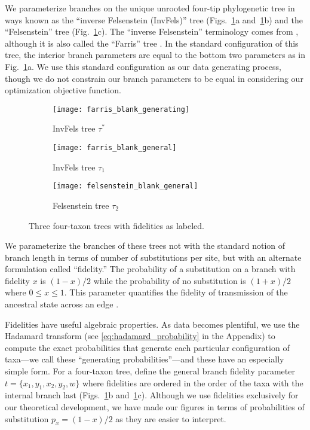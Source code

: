 \documentclass[11pt]{article}
\begin{document}
We parameterize branches on the unique unrooted four-tip phylogenetic tree in ways known as the ``inverse Felsenstein (InvFels)'' tree (Figs.~\ref{fig:farris-fels-top}a and~\ref{fig:farris-fels-top}b) and the ``Felsenstein'' tree (Fig.~\ref{fig:farris-fels-top}c).
The ``inverse Felsenstein'' terminology comes from \citet{Swofford2001-hr}, although it is also called the ``Farris'' tree \citep{Siddall1998-hq, Felsenstein2004}.
In the standard configuration of this tree, the interior branch parameters are equal to the bottom two parameters as in Fig.~\ref{fig:farris-fels-top}a.
We use this standard configuration as our data generating process, though we do not constrain our branch parameters to be equal in considering our optimization objective function.

\begin{figure}
\centering
\begin{subfigure}{.3\linewidth}
\centering
\texttt{[image: farris\_blank\_generating]}
\caption[short]{InvFels tree $\tau^*$}
\end{subfigure}
\begin{subfigure}{.3\linewidth}
\centering
\texttt{[image: farris\_blank\_general]}
\caption[short]{InvFels tree $\tau_1$}
\end{subfigure}
\begin{subfigure}{.3\linewidth}
\centering
\texttt{[image: felsenstein\_blank\_general]}
\caption[short]{Felsenstein tree $\tau_2$}
\end{subfigure}
\caption{Three four-taxon trees with fidelities as labeled.}
\label{fig:farris-fels-top}
\end{figure}

We parameterize the branches of these trees not with the standard notion of branch length in terms of number of substitutions per site, but with an alternate formulation called ``fidelity.''
The probability of a substitution on a branch with fidelity $x$ is $(1-x)/2$ while the probability of no substitution is $(1+x)/2$ where $0 \le x \le 1$.
This parameter quantifies the fidelity of transmission of the ancestral state across an edge \citep{Matsen2007-jq}.

Fidelities have useful algebraic properties.
As data becomes plentiful, we use the Hadamard transform (see \eqref{eq:hadamard_probability} in the Appendix) to compute the exact probabilities that generate each particular configuration of taxa---we call these ``generating probabilities''---and these have an especially simple form.
For a four-taxon tree, define the general branch fidelity parameter $t=\{x_1,y_1,x_2,y_2,w\}$ where fidelities are ordered in the order of the taxa with the internal branch last (Figs.~\ref{fig:farris-fels-top}b and~\ref{fig:farris-fels-top}c).
Although we use fidelities exclusively for our theoretical development, we have made our figures in terms of probabilities of substitution $p_{x} = (1-x)/2$ as they are easier to interpret.
\end{document}
